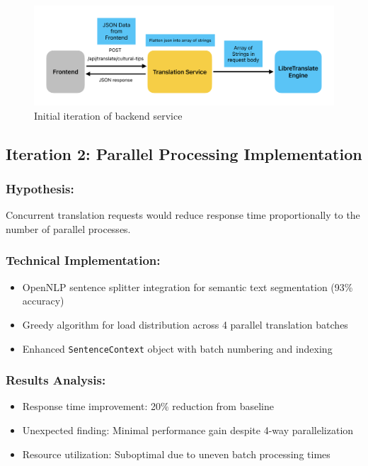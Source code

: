 \begin{figure}[H]
    \centering
    \includegraphics[width=1\linewidth]{chapter/05_implementation/backend/B_architectural_design/Backend_Initial_Concept.pdf}
    \caption{Initial iteration of backend service}
    \label{fig:backend_iteration_1}
\end{figure}

\subsection{Iteration 2: Parallel Processing Implementation}

\subsubsection{Hypothesis:} Concurrent translation requests would reduce response time proportionally to the number of parallel processes.

\subsubsection{Technical Implementation:}
\begin{itemize}
    \item OpenNLP sentence splitter integration for semantic text segmentation (93\% accuracy)
    \item Greedy algorithm for load distribution across 4 parallel translation batches
    \item Enhanced \texttt{SentenceContext} object with batch numbering and indexing
\end{itemize}

\subsubsection{Results Analysis:}
\begin{itemize}
    \item Response time improvement: 20\% reduction from baseline
    \item Unexpected finding: Minimal performance gain despite 4-way parallelization
    \item Resource utilization: Suboptimal due to uneven batch processing times
\end{itemize}

